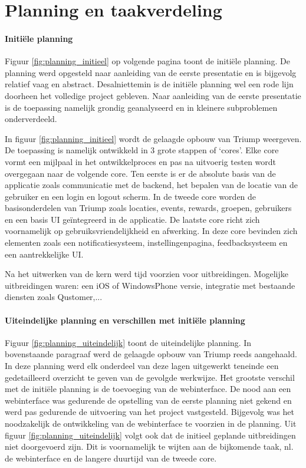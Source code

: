 
\chapter{Planning en taakverdeling}


\subsubsection{Initiële planning}

Figuur \ref{fig:planning_initieel} op volgende pagina toont de initiële planning. De planning werd opgesteld naar aanleiding van de eerste presentatie en is bijgevolg relatief vaag en abstract. Desalniettemin is de initiële planning wel een rode lijn doorheen het volledige project gebleven. Naar aanleiding van de eerste presentatie is de toepassing namelijk grondig geanalyseerd en in kleinere subproblemen onderverdeeld.

In figuur \ref{fig:planning_initieel} wordt de gelaagde opbouw van Triump weergeven. De toepassing is namelijk ontwikkeld in 3 grote stappen of `cores'. Elke core vormt een mijlpaal in het ontwikkelproces en pas na uitvoerig testen wordt overgegaan naar de volgende core. 
Ten eerste is er de absolute basis van de applicatie zoals communicatie met de backend, het bepalen van de locatie van de gebruiker en een login en logout scherm. In de tweede core worden de basisonderdelen van Triump zoals locaties, events, rewards, groepen, gebruikers en een basis UI geïntegreerd in de applicatie. De laatste core richt zich voornamelijk op gebruiksvriendelijkheid en afwerking. In deze core bevinden zich elementen zoals een notificatiesysteem, instellingenpagina, feedbacksysteem en een aantrekkelijke UI.

Na het uitwerken van de kern werd tijd voorzien voor uitbreidingen. Mogelijke uitbreidingen waren: een iOS of WindowsPhone versie, integratie met bestaande diensten zoals Qustomer,... 

\subsubsection{Uiteindelijke planning en verschillen met initiële planning}

Figuur \ref{fig:planning_uiteindelijk} toont de uiteindelijke planning. In bovenstaande paragraaf werd de gelaagde opbouw van Triump reeds aangehaald. In deze planning werd elk onderdeel van deze lagen uitgewerkt teneinde een gedetailleerd overzicht te geven van de gevolgde werkwijze. Het grootste verschil met de initiële planning is de toevoeging van de webinterface. De nood aan een webinterface was gedurende de opstelling van de eerste planning niet gekend en werd pas gedurende de uitvoering van het project vastgesteld. Bijgevolg was het noodzakelijk de ontwikkeling van de webinterface te voorzien in de planning. 
Uit figuur \ref{fig:planning_uiteindelijk} volgt ook dat de initieel geplande uitbreidingen niet doorgevoerd zijn. Dit is voornamelijk te wijten aan de bijkomende taak, nl. de webinterface en de langere duurtijd van de tweede core.

